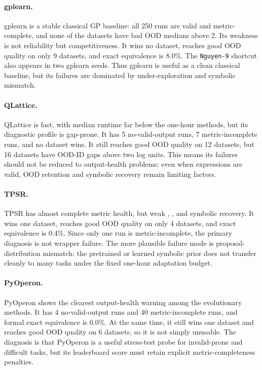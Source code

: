 \paragraph{gplearn.}
gplearn is a stable classical GP baseline: all 250 runs are valid and metric-complete, and none of the datasets have bad OOD medians above 2. Its weakness is not reliability but competitiveness. It wins no dataset, reaches good OOD quality on only 9 datasets, and exact equivalence is 8.0\%. The \texttt{Nguyen-9} shortcut also appears in two gplearn seeds. Thus gplearn is useful as a clean classical baseline, but its failures are dominated by under-exploration and symbolic mismatch.

\paragraph{QLattice.}
QLattice is fast, with median runtime far below the one-hour methods, but its diagnostic profile is gap-prone. It has 5 no-valid-output runs, 7 metric-incomplete runs, and no dataset wins. It still reaches good OOD quality on 12 datasets, but 16 datasets have OOD-ID gaps above two log units. This means its failures should not be reduced to output-health problems: even when expressions are valid, OOD retention and symbolic recovery remain limiting factors.

\paragraph{TPSR.}
TPSR has almost complete metric health, but weak \idq{}, \oodg{}, and symbolic recovery. It wins one dataset, reaches good OOD quality on only 4 datasets, and exact equivalence is 0.4\%. Since only one run is metric-incomplete, the primary diagnosis is not wrapper failure. The more plausible failure mode is proposal-distribution mismatch: the pretrained or learned symbolic prior does not transfer cleanly to many \core{} tasks under the fixed one-hour adaptation budget.

\paragraph{PyOperon.}
PyOperon shows the clearest output-health warning among the evolutionary methods. It has 4 no-valid-output runs and 40 metric-incomplete runs, and formal exact equivalence is 0.0\%. At the same time, it still wins one dataset and reaches good OOD quality on 6 datasets, so it is not simply unusable. The diagnosis is that PyOperon is a useful stress-test probe for invalid-prone and difficult tasks, but its leaderboard score must retain explicit metric-completeness penalties.


